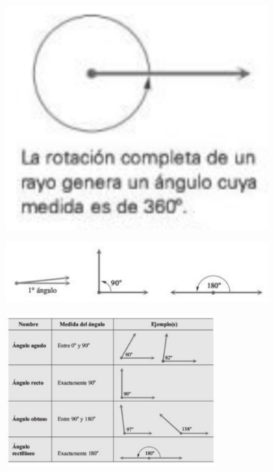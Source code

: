 {}
	\begin{figure}[h]
		\centering
		\includegraphics[width=10cm,keepaspectratio=true]{./trig/trig_101-4.png}
		\label{fig:101-4}
	\end{figure}
	

{}
	\begin{figure}[h]
		\centering
		\includegraphics[width=10cm,keepaspectratio=true]{./trig/trig_101-5.png}
		\label{fig:101-5}
	\end{figure}
	

{}
	\begin{figure}[h]
		\centering
		\includegraphics[width=8cm,keepaspectratio=true]{./trig/trig_101-tab1.png}
		\label{fig:101-tab1}
	\end{figure}
	

